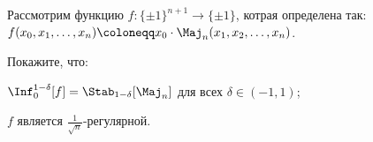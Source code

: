 Рассмотрим функцию $f\colon \{\pm 1\}^{n + 1} \to \{\pm 1\}$, котрая определена так: $f(x_0, x_1, \dots,
x_n) \coloneqq x_0 \cdot \Maj_n(x_1, x_2, \dots, x_n)$.

Покажите, что:
\begin{enumcyr}
    \item $\Inf_0^{1 - \delta}[f] = \Stab_{1 - \delta}[\Maj_n]$ для всех $\delta \in (-1, 1)$;
    \item $f$ является $\frac{1}{\sqrt{n}}$-регулярной.
\end{enumcyr}